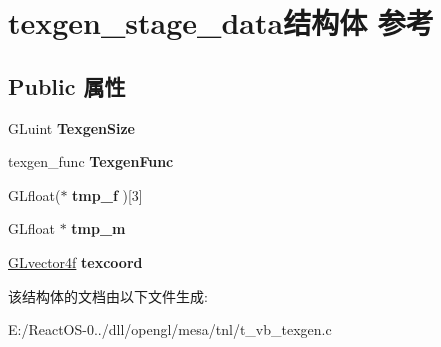 \hypertarget{structtexgen__stage__data}{}\section{texgen\+\_\+stage\+\_\+data结构体 参考}
\label{structtexgen__stage__data}
\subsection*{Public 属性}
\begin{DoxyCompactItemize}
\item 
\mbox{\label{structtexgen__stage__data_aea6fd234377aefdd5eafba62adaf1ce7}} 
G\+Luint {\bfseries Texgen\+Size}
\item 
\mbox{\label{structtexgen__stage__data_ada17346522e3a67dc4420087c6d810c1}} 
texgen\+\_\+func {\bfseries Texgen\+Func}
\item 
\mbox{\label{structtexgen__stage__data_a0e0009eebe1e92fbd44395e7e11a8060}} 
G\+Lfloat($\ast$ {\bfseries tmp\+\_\+f} )\mbox{[}3\mbox{]}
\item 
\mbox{\label{structtexgen__stage__data_a8bf4c639fff1e8d94639af021e4be301}} 
G\+Lfloat $\ast$ {\bfseries tmp\+\_\+m}
\item 
\mbox{\label{structtexgen__stage__data_a3ebb83d90b61ec1af2ad66baa07302f8}} 
\hyperlink{struct_g_lvector4f}{G\+Lvector4f} {\bfseries texcoord}
\end{DoxyCompactItemize}


该结构体的文档由以下文件生成\+:\begin{DoxyCompactItemize}
\item 
E\+:/\+React\+O\+S-\/0../dll/opengl/mesa/tnl/t\+\_\+vb\+\_\+texgen.\+c\end{DoxyCompactItemize}
